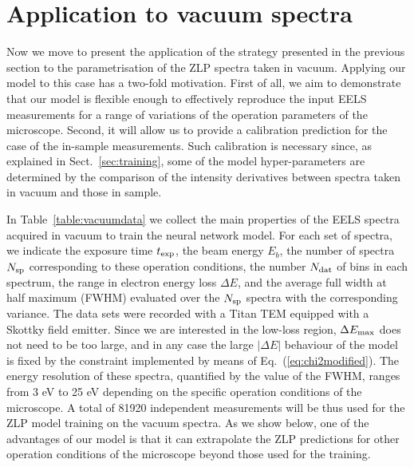 \section{Application to vacuum spectra}
\label{sec:results_vacuum}

Now we move to present the application of the strategy presented in the previous
section to the parametrisation of the ZLP spectra taken in vacuum.
%
Applying our model to this case has a two-fold motivation.
%
First of all, we aim to demonstrate that our model is flexible enough to effectively reproduce the
input EELS measurements for a range of variations of the operation parameters of the microscope.
%
Second, it will allow us to provide a calibration prediction for the case of the in-sample measurements.
%
Such calibration is necessary since, as explained in Sect.~\ref{sec:training}, some of the model
hyper-parameters are determined by the comparison of the intensity derivatives
between spectra taken in vacuum and those in sample.

In Table~\ref{table:vacuumdata} we collect the main properties of the EELS spectra acquired in vacuum to train the neural
    network model.  For each set of spectra, we indicate the exposure time $t_{\rm exp}$, the beam energy
    $E_b$, the number of spectra $N_{\rm sp}$ corresponding to these operation conditions, the number $N_{\rm dat}$ of
    bins in each spectrum, the range in electron energy loss $\Delta E$,
    and the average full width at half maximum (FWHM)
    evaluated over the $N_{\rm sp}$ spectra with the corresponding variance.
    The data sets were recorded with a Titan TEM equipped with a Skottky field emitter.
    Since we are interested in the low-loss region, $\Delta E_{\rm max}$ does not need
    to be too large, and in any case the large $|\Delta E|$ behaviour of the model is fixed
    by the constraint implemented by means of Eq.~(\ref{eq:chi2modified}).
    The energy resolution of these spectra, quantified by the value of the FWHM, ranges
    from 3 eV to 25 eV depending on the specific operation conditions of the microscope.
    A total of 81920 independent measurements will be thus used for the ZLP model
    training on the vacuum spectra.
    As we show below, one of the advantages of our model is that it can extrapolate the ZLP predictions
    for other operation conditions of the microscope beyond those used for the training.

